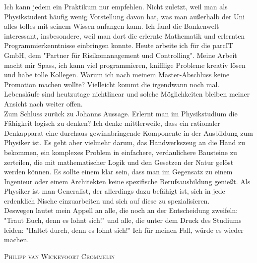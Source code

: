 \begin{multicols*}{2}
Ich kann jedem ein Praktikum nur empfehlen. Nicht zuletzt, weil man als Physikstudent häufig wenig Vorstellung davon hat, was man außerhalb der Uni alles tolles mit seinem Wissen anfangen kann.
Ich fand die Bankenwelt interessant, insbesondere, weil man dort die erlernte Mathematik und erlernten Programmierkenntnisse einbringen konnte.
Heute arbeite ich für die parcIT GmbH, dem "Partner für Risikomanagement und Controlling".
Meine Arbeit macht mir Spass, ich kann viel programmieren, knifflige Probleme kreativ lösen und habe tolle Kollegen. Warum ich nach meinem Master-Abschluss keine Promotion machen wollte?
Vielleicht kommt die irgendwann noch mal. Lebensläufe sind heutzutage nichtlinear und solche Möglichkeiten bleiben meiner Ansicht nach weiter offen. \\ 

Zum Schluss zurück zu Johanns Aussage. Erlernt man im Physikstudium die Fähigkeit logisch zu denken? Ich denke mittlerweile,
dass ein rationaler Denkapparat eine durchaus gewinnbringende Komponente in der Ausbildung zum Physiker ist. Es geht aber vielmehr darum,
das Handwerkszeug an die Hand zu bekommen, ein komplexes Problem in einfachere, verdaulichere Bausteine zu zerteilen,
die mit mathematischer Logik und den Gesetzen der Natur gelöst werden können.
Es sollte einem klar sein, dass man im Gegensatz zu einem Ingenieur oder einem Architekten keine spezifische Berufsausbildung genießt.
Als Physiker ist man Generalist, der allerdings dazu befähigt ist, sich in jede erdenklich Nische einzuarbeiten und sich auf diese zu spezialisieren. \\ 

Deswegen lautet mein Appell an alle, die noch an der Entscheidung zweifeln: "Traut Euch, denn es lohnt sich!" und alle, die unter dem Druck des Studiums leiden: "Haltet durch, denn es lohnt sich!" Ich für meinen Fall, würde es wieder machen. \\ 

\vspace{0.8cm}

\textsc{Philipp van Wickevoort Crommelin}  



\end{multicols*}
